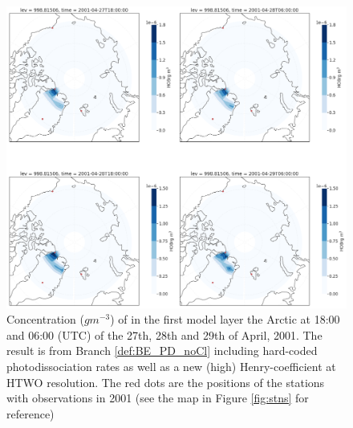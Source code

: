 \begin{figure}[h]
    \centering
    \includegraphics[width=\linewidth]{Chapter6_Results/images/polarHOBr_HTWO_step3.png}
    \caption{Concentration ($g m^{-3}$) of  in the first model layer the Arctic at 18:00 and 06:00 (UTC) of the 27th, 28th and 29th of April, 2001. The result is from  Branch \ref{def:BE_PD_noCl} including hard-coded photodissociation rates as well as a new (high) Henry-coefficient at HTWO resolution. The red dots are the positions of the stations with observations in 2001 (see the map in Figure \ref{fig:stns} for reference)}
    \label{fig:polarHOBr_HTWO_step3}
\end{figure}